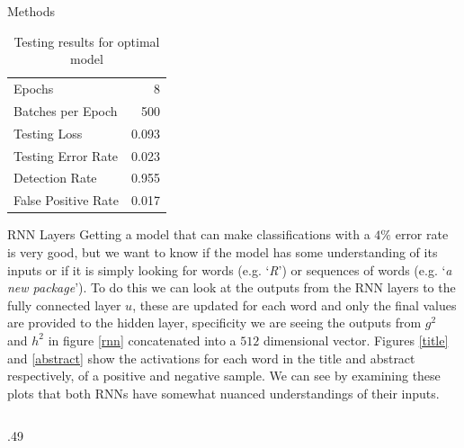 \documentclass[final]{beamer}
\newlength{\onecolwid}
\begin{document}
\begin{frame}{}
\begin{columns}[t]
\begin{column}{\onecolwid}
\begin{alertblock}{Methods}
		\begin{table}
			\vspace{2ex}
			\begin{tabular}{l r}
				\toprule
				Epochs & 8  \\
				Batches per Epoch & 500\\
				Testing Loss &   0.093 \\
				Testing Error Rate & 0.023 \\
				Detection Rate & 0.955\\
				False Positive Rate& 0.017\\
				\bottomrule
			\end{tabular}
			\caption{Testing results for optimal model}\label{t1}
		\end{table}
	\end{alertblock}
	\begin{alertblock}{RNN Layers}
		\justifying
		Getting a model that can make classifications with a $4\%$ error rate is very good, but we want to know if the model has some understanding of its inputs or if it is simply looking for words (e.g. `\textit{R}') or sequences of words (e.g. `\textit{a new package}'). To do this we can look at the outputs from the RNN layers to the fully connected layer $u$, these are updated for each word and only the final values are provided to the hidden layer, specificity we are seeing  the outputs from $g^2$ and $h^2$ in figure \ref{rnn} concatenated into a $512$ dimensional vector. Figures \ref{title} and \ref{abstract} show the activations for each word in the title and abstract respectively, of a positive and negative sample. We can see by examining these plots that both RNNs have somewhat nuanced understandings of their inputs.
	\end{alertblock}
	\vspace{1cm}
\begin{columns}[t,totalwidth=\onecolwid] %
	
	\begin{column}{.49\onecolwid}\vspace{-.6in} %

		\begin{block}
			

\end{block}
\end{column}
\end{columns}
\end{column}
\end{columns}
\end{frame}
\end{document}
